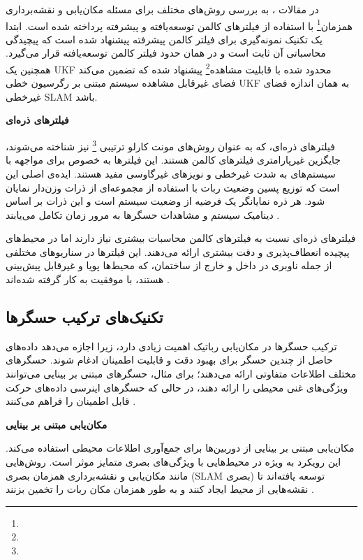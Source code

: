  
در مقالات 
\cite{huang2013quadratic, kim2008unscented, cheng2014compressed}
، به بررسی روش‌های مختلف برای مسئله مکان‌یابی و نقشه‌برداری همزمان\footnote{}
 با استفاده از فیلترهای کالمن توسعه‌یافته و پیشرفته پرداخته شده است. ابتدا یک تکنیک نمونه‌گیری برای فیلتر کالمن پیشرفته پیشنهاد شده است که پیچیدگی محاسباتی آن ثابت است و در همان حدود فیلتر کالمن توسعه‌یافته قرار می‌گیرد. همچنین یک UKF محدود شده با قابلیت مشاهده\footnote{} پیشنهاد شده که تضمین می‌کند فضای غیرقابل مشاهده سیستم مبتنی بر رگرسیون خطی UKF به همان اندازه فضای غیرخطی SLAM باشد.
 

\textbf {فیلترهای ذره‌ای}

فیلترهای ذره‌ای، که به عنوان روش‌های مونت کارلو ترتیبی
\footnote{}
 نیز شناخته می‌شوند، جایگزین غیرپارامتری فیلترهای کالمن هستند. این فیلترها به خصوص برای مواجهه با سیستم‌های به شدت غیرخطی و نویزهای غیرگاوسی مفید هستند. ایده‌ی اصلی این است که توزیع پسین وضعیت ربات با استفاده از مجموعه‌ای از ذرات وزن‌دار نمایان شود. هر ذره نمایانگر یک فرضیه از وضعیت سیستم است و این ذرات بر اساس دینامیک سیستم و مشاهدات حسگرها به مرور زمان تکامل می‌یابند
\cite{fox2001particle}.

فیلترهای ذره‌ای نسبت به فیلترهای کالمن محاسبات بیشتری نیاز دارند اما در محیط‌های پیچیده انعطاف‌پذیری و دقت بیشتری ارائه می‌دهند. این فیلترها در سناریوهای مختلفی از جمله ناوبری در داخل و خارج از ساختمان، که محیط‌ها پویا و غیرقابل پیش‌بینی هستند، با موفقیت به کار گرفته شده‌اند
 \cite{fox2001particle, montemerlo2002conditional, kwok2003adaptive}.

\subsection{تکنیک‌های ترکیب حسگرها}

ترکیب حسگرها در مکان‌یابی رباتیک اهمیت زیادی دارد، زیرا اجازه می‌دهد داده‌های حاصل از چندین حسگر برای بهبود دقت و قابلیت اطمینان ادغام شوند. حسگرهای مختلف اطلاعات متفاوتی ارائه می‌دهند؛ برای مثال، حسگرهای مبتنی بر بینایی می‌توانند ویژگی‌های غنی محیطی را ارائه دهند، در حالی که حسگرهای اینرسی داده‌های حرکت قابل اطمینان را فراهم می‌کنند
\cite{srinivasan2007multiple}.

\textbf{مکان‌یابی مبتنی بر بینایی}

مکان‌یابی مبتنی بر بینایی از دوربین‌ها برای جمع‌آوری اطلاعات محیطی استفاده می‌کند. این رویکرد به ویژه در محیط‌هایی با ویژگی‌های بصری متمایز موثر است. روش‌هایی مانند مکان‌یابی و نقشه‌برداری همزمان بصری (SLAM بصری) توسعه یافته‌اند تا نقشه‌هایی از محیط ایجاد کنند و به طور همزمان مکان ربات را تخمین بزنند
 \cite{westman2018underwater, hiebert2022introduction}.

